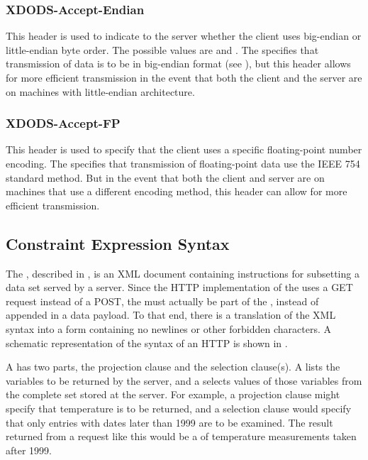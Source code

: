 \documentclass[justify]{dods-paper}
\begin{document}
\subsubsection{XDODS-Accept-Endian}
\label{sec-accept-endian}

This header is used to indicate to the server whether the client uses
big-endian or little-endian byte order.  The possible values are
 and .  The \DAP specifies that transmission of
data is to be in big-endian format (see \DAPObjects), but
this header allows for more efficient transmission in the event that
both the client and the server are on machines with little-endian
architecture. 


\subsubsection{XDODS-Accept-FP}
\label{sec-accept-fp}

This header is used to specify that the client uses a specific
floating-point number encoding.  The \DAP specifies that transmission
of floating-point data use the IEEE 754 standard method.  But in the
event that both the client and server are on machines that use a
different encoding method, this header can allow for more efficient
transmission.  

\subsection{Constraint Expression Syntax}
\label{sec-ce-http}

The \CE, described in \DAPObjects, is an XML document containing
instructions for subsetting a data set served by a \DAP server.  Since
the HTTP implementation of the \DAP uses a GET request instead of a
POST, the \CE must actually be part of the \URL, instead of appended in
a data payload.  To that end, there is a translation of the XML \CE
syntax into a form containing no newlines or other forbidden characters.
A schematic representation of the syntax of an HTTP \CE is shown in
.

A \CE has two parts, the projection clause and the selection
clause(s). A  lists the variables to be returned by
the \DAP server, and a  selects values of those
variables from the complete set stored at the server.  For example, a
projection clause might specify that temperature is to be returned,
and a selection clause would specify that only \Sequence entries with
dates later than 1999 are to be examined.  The result returned from a
request like this would be a \Sequence of temperature measurements
taken after 1999.
\end{document}
